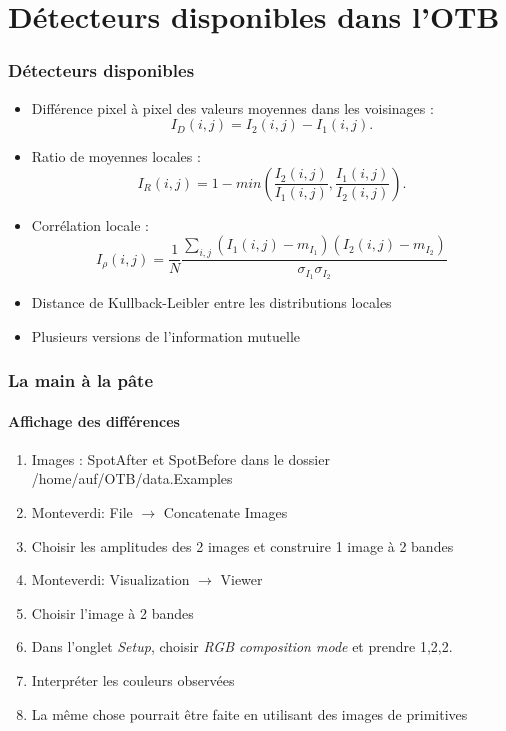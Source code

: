 \documentclass[compress]{beamer}
\begin{document}
\section[Détecteurs]{Détecteurs disponibles dans l'OTB}
\begin{frame}
  \frametitle{Détecteurs disponibles}
  \small
  \begin{itemize}
    \item Différence pixel à pixel des valeurs moyennes dans les
      voisinages :
      \begin{equation}
	I_{D}(i,j)=I_{2}(i,j)-I_{1}(i,j).
      \end{equation}
    \item Ratio de moyennes locales :
      \begin{equation}
\displaystyle I_{R}(i,j) = 1 - min \left(\frac{\displaystyle I_{2}(i,j)}{\displaystyle I_{1}(i,j)},\frac{\displaystyle I_{1}(i,j)}{\displaystyle I_{2}(i,j)}\right).
\end{equation}
      \item Corrélation locale :
\begin{equation}
  I_\rho(i,j) = \frac{1}{N}\frac{\sum_{i,j}(I_1(i,j)-m_{I_1})(I_2(i,j)-m_{I_2})}{\sigma_{I_1}
\sigma_{I_2}}
\end{equation}
\item Distance de Kullback-Leibler entre les distributions locales
  \item Plusieurs versions de l'information mutuelle
  \end{itemize}
  \normalsize
\end{frame}

\begin{frame}
  \frametitle{La main à la pâte}
  \framesubtitle{Affichage des différences}
  \begin{enumerate}
  \item Images : SpotAfter et SpotBefore dans le dossier /home/auf/OTB/data.Examples
  \item Monteverdi: File $\rightarrow$ Concatenate Images
  \item Choisir les amplitudes des 2 images et construire 1 image à 2 bandes
  \item Monteverdi: Visualization $\rightarrow$ Viewer
  \item Choisir l'image à 2 bandes
  \item Dans l'onglet {\em Setup}, choisir {\em RGB composition mode}
    et prendre 1,2,2.
  \item Interpréter les couleurs observées
  \item La même chose pourrait être faite en utilisant des images de primitives
  \end{enumerate}
\end{frame}
\end{document}
